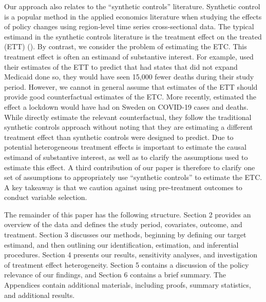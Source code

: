 Our approach also relates to the ``synthetic controls'' literature. Synthetic control is a popular method in the applied economics literature when studying the effects of policy changes using region-level time series cross-sectional data. The typical estimand in the synthetic controls literature is the treatment effect on the treated (ETT) (\cite{abadie2010synthetic}). By contrast, we consider the problem of estimating the ETC. This treatment effect is often an estimand of substantive interest. For example, \cite{miller2019medicaid} used their estimates of the ETT to predict that had states that did not expand Medicaid done so, they would have seen 15,000 fewer deaths during their study period. However, we cannot in general assume that estimates of the ETT should provide good counterfactual estimates of the ETC. More recently, \cite{born2020lockdowns} estimated the effect a lockdown would have had on Sweden on COVID-19 cases and deaths. While \cite{born2020lockdowns} directly estimate the relevant counterfactual, they follow the traditional synthetic controls approach without noting that they are estimating a different treatment effect than synthetic controls were designed to predict. Due to potential heterogeneous treatment effects is important to estimate the causal estimand of substantive interest, as well as to clarify the assumptions used to estimate this effect. A third contribution of our paper is therefore to clarify one set of assumptions to appropriately use ``synthetic controls'' to estimate the ETC. A key takeaway is that we caution against using pre-treatment outcomes to conduct variable selection. 

The remainder of this paper has the following structure. Section 2 provides an overview of the data and defines the study period, covariates, outcome, and treatment. Section 3 discusses our methods, beginning by defining our target estimand, and then outlining our identification, estimation, and inferential procedures. Section 4 presents our results, sensitivity analyses, and investigation of treatment effect heterogeneity. Section 5 contains a discussion of the policy relevance of our findings, and Section 6 contains a brief summary. The Appendices contain additional materials, including proofs, summary statistics, and additional results.
